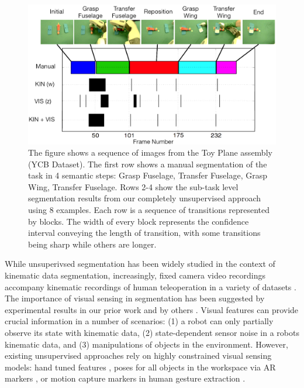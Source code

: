 \begin{figure}[ht]
\centering
\includegraphics[width=\linewidth]{figures/pr2_plane_assembly.png}
\caption{The figure shows a sequence of images from the Toy Plane assembly (YCB Dataset). The first row shows a manual segmentation of the task in 4 semantic steps: Grasp Fuselage, Transfer Fuselage, Grasp Wing, Transfer Fuselage. Rows 2-4 show the sub-task level segmentation results from our completely unsupervised approach using 8 examples. Each row is a sequence of transitions represented by blocks. The width of every block represents the confidence interval conveying the length of transition, with some transitions being sharp while others are longer.}
\vspace{-10pt} 
\end{figure}

While unsuperivsed segmentation has been widely studied in the context of kinematic data segmentation, increasingly, fixed camera video recordings accompany kinematic recordings of human teleoperation in a variety of datasets \cite{hodgins2009guide, gao2014jigsaws, ofli2013berkeley}.
The importance of visual sensing in segmentation has been suggested by experimental results in our prior work \cite{krishnan2015tsc} and by others \cite{Niekum2015learning}.
Visual features can provide crucial information in a number of scenarios: (1) a robot can only partially observe its state with kinematic data, (2) state-dependent sensor noise in a robots kinematic data, and (3) manipulations of objects in the environment.
However, existing unsupervised approaches rely on highly constrained visual sensing models: hand tuned features \cite{krishnan2015tsc}, poses for all objects in the workspace via AR markers \cite{Niekum2015learning}, or motion capture markers in human gesture extraction \cite{kulic2011incremental}.

